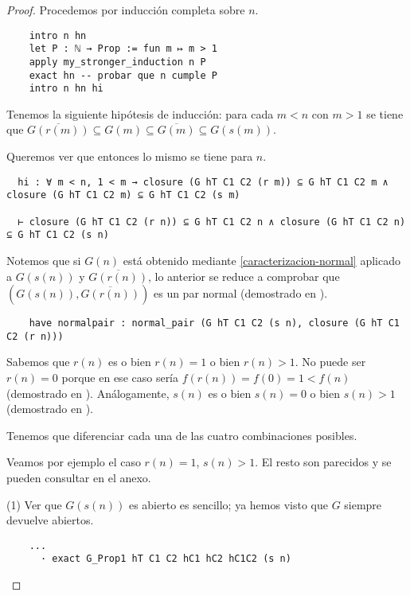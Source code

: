\begin{proof}
  Procedemos por inducción completa sobre $n$.

  \begin{lstlisting}
    intro n hn
    let P : ℕ → Prop := fun m ↦ m > 1
    apply my_stronger_induction n P
    exact hn -- probar que n cumple P
    intro n hn hi \end{lstlisting}

  Tenemos la siguiente hipótesis de inducción: para cada $m < n$ con $m > 1$ se tiene que $\overline{G(r(m))} \subseteq G(m) \subseteq \overline{G(m)} \subseteq G(s(m))$.

  Queremos ver que entonces lo mismo se tiene para $n$.

  \begin{lstlisting}
  hi : ∀ m < n, 1 < m → closure (G hT C1 C2 (r m)) ⊆ G hT C1 C2 m ∧ closure (G hT C1 C2 m) ⊆ G hT C1 C2 (s m)

  ⊢ closure (G hT C1 C2 (r n)) ⊆ G hT C1 C2 n ∧ closure (G hT C1 C2 n) ⊆ G hT C1 C2 (s n) \end{lstlisting}

  Notemos que si $G(n)$ está obtenido mediante \ref{caracterizacion-normal} aplicado a $G(s(n))$ y $\overline{G(r(n))}$, lo anterior se reduce a comprobar que $(G(s(n)), \overline{G(r(n))})$ es un par normal (demostrado en ).

  \begin{lstlisting}
    have normalpair : normal_pair (G hT C1 C2 (s n), closure (G hT C1 C2 (r n))) \end{lstlisting}

  Sabemos que $r(n)$ es o bien $r(n) = 1$ o bien $r(n) > 1$. No puede ser $r(n) = 0$ porque en ese caso sería $f(r(n)) = f(0) = 1 < f(n)$ (demostrado en ). Análogamente, $s(n)$ es o bien $s(n) =0$ o bien $s(n) > 1$ (demostrado en ).

  Tenemos que diferenciar cada una de las cuatro combinaciones posibles.

  Veamos por ejemplo el caso $r(n) = 1$, $s(n) > 1$. El resto son parecidos y se pueden consultar en el anexo.

  (1) Ver que $G(s(n))$ es abierto es sencillo; ya hemos visto que $G$ siempre devuelve abiertos.

  \begin{lstlisting}
    ...
      · exact G_Prop1 hT C1 C2 hC1 hC2 hC1C2 (s n) \end{lstlisting}


\end{proof}
